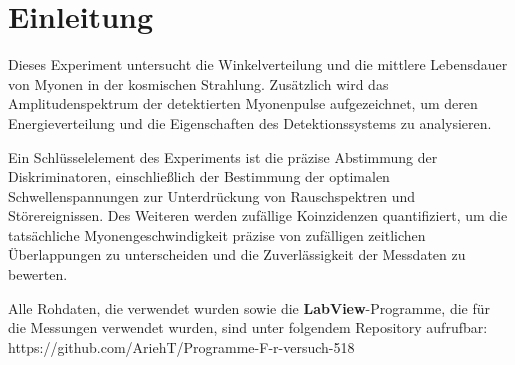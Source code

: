 \chapter{Einleitung}
Dieses Experiment untersucht die Winkelverteilung und die mittlere Lebensdauer von Myonen in der kosmischen Strahlung. Zusätzlich wird das Amplitudenspektrum der detektierten Myonenpulse aufgezeichnet, um deren Energieverteilung und die Eigenschaften des Detektionssystems zu analysieren.

Ein Schlüsselelement des Experiments ist die präzise Abstimmung der Diskriminatoren, einschließlich der Bestimmung der optimalen Schwellenspannungen zur Unterdrückung von Rauschspektren und Störereignissen. Des Weiteren werden zufällige Koinzidenzen quantifiziert, um die tatsächliche Myonengeschwindigkeit präzise von zufälligen zeitlichen Überlappungen zu unterscheiden und die Zuverlässigkeit der Messdaten zu bewerten.

Alle Rohdaten, die verwendet wurden sowie die \textbf{LabView}-Programme, die für die Messungen verwendet wurden, sind unter folgendem Repository aufrufbar: https://github.com/AriehT/Programme-F-r-versuch-518